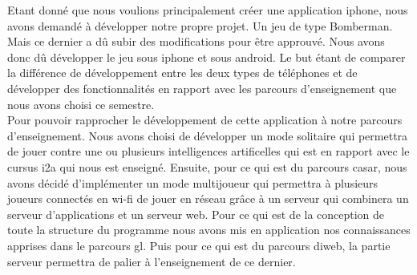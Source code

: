 
 Etant donné que nous voulions principalement créer une application
 \gls{iphone}, nous avons demandé à développer notre propre projet. Un jeu de
 type Bomberman. Mais ce dernier a dû subir des modifications pour être
 approuvé. Nous avons donc dû développer le jeu sous \gls{iphone} et sous
 \gls{android}. Le but étant de comparer la différence de développement entre
 les deux types de téléphones et de développer des fonctionnalités en rapport
 avec les parcours d'enseignement que nous avons choisi ce semestre.\\
	
	
Pour pouvoir rapprocher le développement de cette application à notre parcours
d'enseignement. Nous avons choisi de développer un mode solitaire qui permettra
de jouer contre une ou plusieurs intelligences artificelles qui est en rapport
avec le cursus \gls{i2a} qui nous est enseigné. Ensuite, pour ce qui est du
parcours \gls{casar}, nous avons décidé d'implémenter un mode multijoueur qui
permettra à plusieurs joueurs connectés en \gls{wi-fi} de jouer en réseau grâce
à un serveur qui combinera un serveur d'applications et un serveur web. Pour ce qui est de la conception de toute la structure du programme nous avons mis en application nos connaissances apprises dans le parcours \gls{gl}. Puis pour ce qui est du parcours \gls{diweb}, la partie serveur permettra de palier à
l'enseignement de ce dernier. 
	
